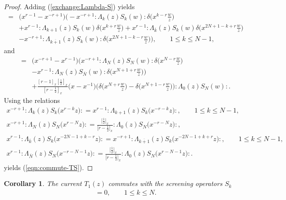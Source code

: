 \documentclass[10pt,a4paper]{amsart}
\numberwithin{equation}{section}
\newtheorem{Corollary}[Theorem]{Corollary}
\begin{document}
\begin{proof}
Adding (\ref{exchange:Lambda-S}) yields
\begin{align*}
[T_1(z),S_k(w)]={}&\big(x^{r-1}-x^{-r+1}\big)
\bigg({-}x^{-r+1}{:}\Lambda_k(z)S_k(w){:}\delta\bigg(x^{k-r}\frac{w}{z}\bigg)
\\
&+x^{r-1}{:}\Lambda_{k+1}(z)S_k(w){}\delta\bigg(x^{k+r}\frac{w}{z}\bigg)
+x^{r-1}{:}\Lambda_{\overline{k}}(z)S_k(w){}\delta\bigg(x^{2N+1-k+r}\frac{w}{z}\bigg)
\\
&-x^{-r+1}{:}\Lambda_{\overline{k+1}}(z)S_k(w){:}
\delta\bigg(x^{2N+1-k-r}\frac{w}{z}\bigg)\bigg),
\qquad
1\leq k \leq N-1,
\end{align*}
and
\begin{align*}
[T_1(z),S_N(w)]={}&\big(x^{-r+1}-x^{r-1}\big)
\bigg(x^{-r+1}{:}\Lambda_N(z)S_N(w){:}\delta\bigg(x^{N-r}\frac{w}{z}\bigg)
\\
&-x^{r-1}{:}\Lambda_N(z)S_{\overline{N}}(w){:}
\delta\bigg(x^{N+1+r}\frac{w}{z}\bigg)\bigg)
\\
&+\frac{[r-1]_x[\frac{1}{2}]_x}{[r-\frac{1}{2}]_x}\big(x-x^{-1}\big)
\bigg(\delta\bigg(x^{N+r}\frac{w}{z}\bigg)-\delta\bigg(x^{N+1-r}\frac{w}{z}
\bigg)\bigg){:}\Lambda_0(z)S_N(w){:}.
\end{align*}
Using the relations
\begin{gather*}
x^{-r+1}{:}\Lambda_k(z)S_k\big(x^{r-k}z\big){:}
=x^{r-1}{:}\Lambda_{k+1}(z)S_k\big(x^{-r-k}z\big){:},\qquad
1\leq k \leq N-1,
\\
x^{-r+1}{:}\Lambda_N(z)S_N\big(x^{r-N}z\big){:}
=\frac{\big[\frac{1}{2}\big]_x}{\big[r-\frac{1}{2}\big]_x}
{:}\Lambda_{0}(z)S_N\big(x^{-r-N}z\big){:},
\\
x^{r-1}{:}\Lambda_{\overline{k}}(z)S_k\big(x^{-2N{-}1+k-r}z\big){:}
=x^{-r+1}{:}\Lambda_{\overline{k+1}}(z)
S_k\big(x^{-2N{-}1+k+r}z\big){:},\qquad 1\leq k \leq N-1,
\\
x^{r-1}{:}\Lambda_{\overline{N}}(z)S_N\big(x^{-r-N-1}z\big){:}
=\frac{\big[\frac{1}{2}\big]_x}{\big[r-\frac{1}{2}\big]_x}
{:}\Lambda_{0}(z)S_N\big(x^{r-N-1}z\big){:}.
\end{gather*}
yields (\ref{eqn:commute-TS}).
\end{proof}


\begin{Corollary}
The current $T_1(z)$ commutes with the screening operators $S_k$
\begin{gather}
[T_1(z), S_k]=0,\qquad 1\leq k \leq N.
\label{eqn:screening2}
\end{gather}
\end{Corollary}
\end{document}
